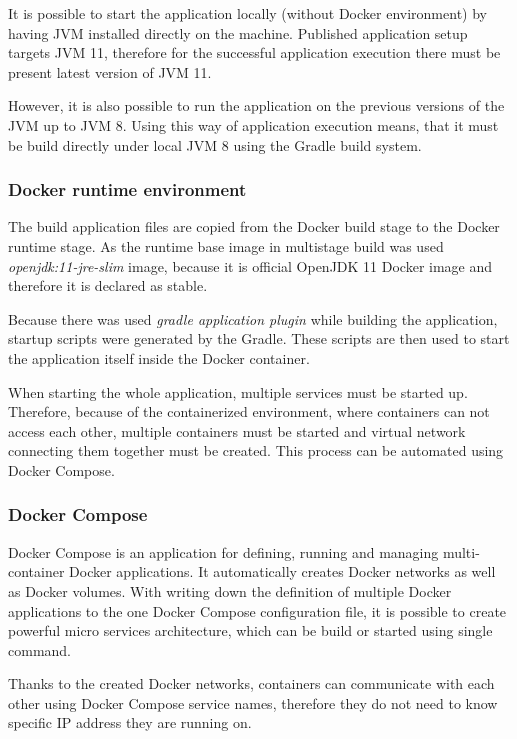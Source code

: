 It is possible to start the application locally (without Docker environment) by having JVM installed directly on the machine.
Published application setup targets JVM 11, 
therefore for the successful application execution there must be present latest version of JVM 11.

However,
it is also possible to run the application on the previous versions of the JVM up to JVM 8.
Using this way of application execution means,
that it must be build directly under local JVM 8 using the Gradle build system.

\subsubsection{Docker runtime environment}\label{subsubsec:docker-runtime-env}
The build application files are copied from the Docker build stage to the Docker runtime stage.
As the runtime base image in multistage build was used \textit{openjdk:11-jre-slim} image,
because it is official OpenJDK 11 Docker image and therefore it is declared as stable.

Because there was used \textit{gradle application plugin} while building the application, 
startup scripts were generated by the Gradle.
These scripts are then used to start the application itself inside the Docker container.

When starting the whole application, 
multiple services must be started up.
Therefore, because of the containerized environment,
where containers can not access each other,
multiple containers must be started and virtual network connecting them together must be created.
This process can be automated using Docker Compose.

\subsubsection{Docker Compose}
Docker Compose\cite{dockerComposeReference} is an application for defining, running and managing multi-container Docker applications.
It automatically creates Docker networks as well as Docker volumes.
With writing down the definition of multiple Docker applications to the one Docker Compose configuration file,
it is possible to create powerful micro services architecture, 
which can be build or started using single command.

Thanks to the created Docker networks,
containers can communicate with each other using Docker Compose service names,
therefore they do not need to know specific IP address they are running on.

